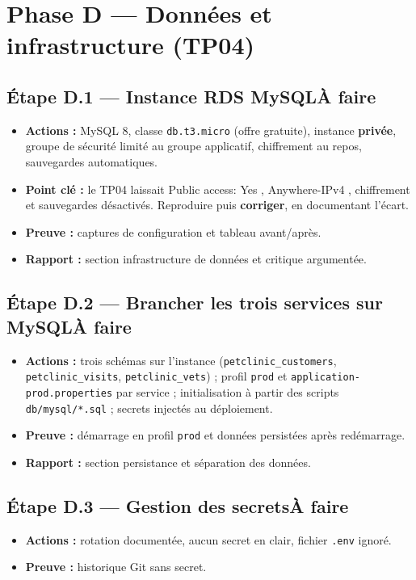\documentclass[12pt,a4paper]{article}
\newcommand{\code}[1]{\texttt{\small #1}}
\newcommand{\fait}{\hfill\textcolor{green!45!black}{\small\textbf{Fait}}}
\newcommand{\afaire}{\hfill\textcolor{orange!80!black}{\small\textbf{\`A faire}}}
\newcommand{\etape}[2]{%
  \subsection*{#1\ifstrequal{#2}{f}{\fait}{\afaire}}%
}
\begin{document}
\section{Phase D --- Donn\'ees et infrastructure (TP04)}

\etape{\'Etape D.1 --- Instance RDS MySQL}{a}
\begin{itemize}[leftmargin=1.4em,itemsep=0.1em]
  \item \textbf{Actions :} MySQL 8, classe \code{db.t3.micro} (offre gratuite),
        instance \textbf{priv\'ee}, groupe de s\'ecurit\'e limit\'e au groupe applicatif,
        chiffrement au repos, sauvegardes automatiques.
  \item \textbf{Point cl\'e :} le TP04 laissait \guillemotleft{} Public access: Yes \guillemotright{},
        \guillemotleft{} Anywhere-IPv4 \guillemotright{}, chiffrement et sauvegardes d\'esactiv\'es.
        Reproduire puis \textbf{corriger}, en documentant l'\'ecart.
  \item \textbf{Preuve :} captures de configuration et tableau avant/apr\`es.
  \item \textbf{Rapport :} section infrastructure de donn\'ees et critique argument\'ee.
\end{itemize}

\etape{\'Etape D.2 --- Brancher les trois services sur MySQL}{a}
\begin{itemize}[leftmargin=1.4em,itemsep=0.1em]
  \item \textbf{Actions :} trois sch\'emas sur l'instance (\code{petclinic\_customers},
        \code{petclinic\_visits}, \code{petclinic\_vets}) ; profil \code{prod} et
        \code{application-prod.properties} par service ; initialisation \`a partir des
        scripts \code{db/mysql/*.sql} ; secrets inject\'es au d\'eploiement.
  \item \textbf{Preuve :} d\'emarrage en profil \code{prod} et donn\'ees persist\'ees apr\`es red\'emarrage.
  \item \textbf{Rapport :} section persistance et s\'eparation des donn\'ees.
\end{itemize}

\etape{\'Etape D.3 --- Gestion des secrets}{a}
\begin{itemize}[leftmargin=1.4em,itemsep=0.1em]
  \item \textbf{Actions :} rotation document\'ee, aucun secret en clair, fichier \code{.env} ignor\'e.
  \item \textbf{Preuve :} historique Git sans secret.
\end{itemize}
\end{document}

